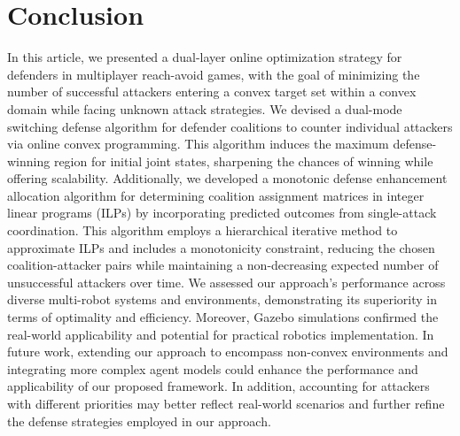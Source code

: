 \documentclass[journal]{IEEEtran}
\newcommand{\1}{\mathbf{1}}
\begin{document}
\section{Conclusion}

In this article, we presented a dual-layer online optimization strategy for defenders in multiplayer reach-avoid games, with the goal of minimizing the number of successful attackers entering a convex target set within a convex domain while facing unknown attack strategies. We devised a dual-mode switching defense algorithm for defender coalitions to counter individual attackers via online convex programming. This algorithm induces the maximum defense-winning region for initial joint states, sharpening the chances of winning while offering scalability. Additionally, we developed a monotonic defense enhancement allocation algorithm for determining coalition assignment matrices in integer linear programs (ILPs) by incorporating predicted outcomes from single-attack coordination. This algorithm employs a hierarchical iterative method to approximate ILPs and includes a monotonicity constraint, reducing the chosen coalition-attacker pairs while maintaining a non-decreasing expected number of unsuccessful attackers over time. We assessed our approach's performance across diverse multi-robot systems and environments, demonstrating its superiority in terms of optimality and efficiency. Moreover, Gazebo simulations confirmed the real-world applicability and potential for practical robotics implementation. In future work, extending our approach to encompass non-convex environments and integrating more complex agent models could enhance the performance and applicability of our proposed framework. In addition, accounting for attackers with different priorities may better reflect real-world scenarios and further refine the defense strategies employed in our approach.

\appendix
\end{document}
